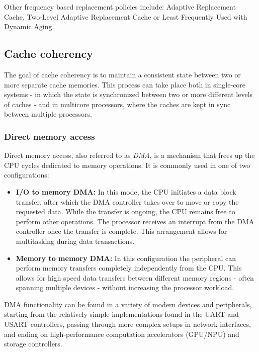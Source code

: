 \vspace{10px}\noindent Other frequency based replacement policies include: Adaptive Replacement Cache, Two-Level Adaptive Replacement Cache or Least Frequently Used with Dynamic Aging. %
%
\subsection{Cache coherency}

The goal of cache coherency is to maintain a consistent state between two or
more separate cache memories. This process can take place both in single-core
systems - in which the state is synchronized between two or more different levels of caches
- and in multicore processors, where the caches are kept in sync between multiple
processors.

\subsubsection{Direct memory access} \label{sec:dma}
Direct memory access, also referred to as \textit{DMA}, is a mechanism that
frees up the CPU cycles dedicated to memory operations. It is commonly used 
in one of two configurations:

\begin{itemize}
	\item \textbf{I/O to memory DMA:} In this mode, the CPU initiates a data block %
		transfer, after which the DMA controller takes over to move or copy the requested data.
		While the transfer is ongoing, the CPU remains free to perform other operations.
		The processor receives an interrupt from the DMA controller once the transfer is complete.
		This arrangement allows for multitasking during data transactions.
	\item \textbf{Memory to memory DMA:} In this configuration the peripheral can perform memory %
		transfers completely independently from the CPU. This allows for high speed data transfers
		between different memory regions - often spanning multiple devices - without increasing
		the processor workload.
\end{itemize}

\noindent DMA functionality can be found in a variety of modern devices and
peripherals, starting from the relatively simple implementations found in the
UART and USART controllers, passing through more complex setups in network %
interfaces, and ending on high-performance computation accelerators (GPU/NPU)
and storage controllers.

